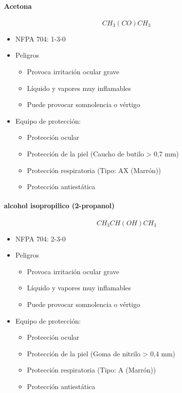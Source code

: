 \paragraph{Acetona} \textit{$$CH_3(CO)CH_3$$} \cite{acetona}
\begin{itemize}
    \item NFPA 704: 1-3-0 \cite{nfpa704}
    \item Peligros
    \begin{itemize}
        \item Provoca irritación ocular grave
        \item Líquido y vapores muy inflamables
        \item Puede provocar somnolencia o vértigo
    \end{itemize}
    \item Equipo de protección: 
    \begin{itemize}
        \item Protección ocular
        \item Protección de la piel (Caucho de butilo > 0,7 mm)
        \item Protección respiratoria (Tipo: AX \cite{abek} (Marrón))
        \item Protección antiestática
    \end{itemize}
\end{itemize}

\paragraph{alcohol isopropilico (2-propanol)} \textit{$$CH_3CH(OH)CH_3$$} \cite{isopropilico}
\begin{itemize}
    \item NFPA 704: 2-3-0 \cite{nfpa704}
    \item Peligros
    \begin{itemize}
        \item Provoca irritación ocular grave
        \item Líquido y vapores muy inflamables
        \item Puede provocar somnolencia o vértigo
    \end{itemize}
    \item Equipo de protección: 
    \begin{itemize}
        \item Protección ocular
        \item Protección de la piel (Goma de nitrilo > 0,4 mm)
        \item Protección respiratoria (Tipo: A \cite{abek} (Marrón))
        \item Protección antiestática
    \end{itemize}
\end{itemize}

